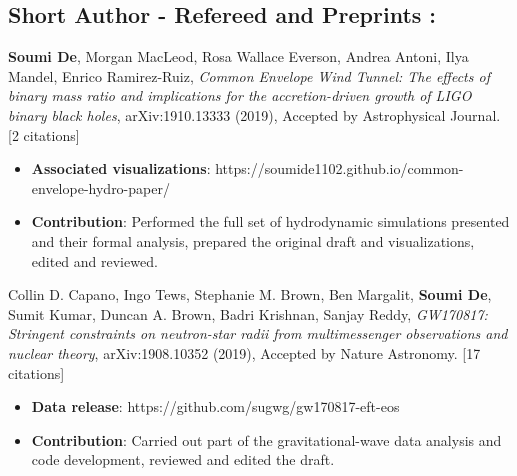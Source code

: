 \subsection{\textbf{Short Author - Refereed and Preprints :}}
\vspace{1mm}
\begin{etaremune}
\renewcommand{\labelenumi}{\textcolor{gray}{\arabic{enumi}.}}
\item{\textbf{Soumi De}, Morgan MacLeod, Rosa Wallace Everson, Andrea Antoni, Ilya Mandel, Enrico Ramirez-Ruiz, \textit{Common Envelope Wind Tunnel: The effects of binary mass ratio and implications for the accretion-driven growth of LIGO binary black holes}, arXiv:1910.13333 (2019), Accepted by Astrophysical Journal. [2 citations]
\begin{itemize}
\vspace{-2mm}
    \item \textbf{Associated visualizations}: https://soumide1102.github.io/common-envelope-hydro-paper/
    \vspace{-1mm}
    \item \textbf{Contribution}: Performed the full set of hydrodynamic simulations presented and their formal analysis, %
    prepared the original draft and visualizations, edited and reviewed.
\end{itemize}
}

\item{Collin D. Capano, Ingo Tews, Stephanie M. Brown, Ben Margalit, \textbf{Soumi De}, Sumit Kumar, Duncan A. Brown, Badri Krishnan, Sanjay Reddy, \textit{GW170817: Stringent constraints on neutron-star radii from multimessenger observations and nuclear theory}, arXiv:1908.10352 (2019), Accepted by Nature Astronomy. [17 citations]
\begin{itemize}
\vspace{-2mm}
    \item \textbf{Data release}: https://github.com/sugwg/gw170817-eft-eos
    \vspace{-1mm}
    \item \textbf{Contribution}:
    Carried out part of the gravitational-wave data analysis and code development, %
    reviewed and edited the draft.
\end{itemize}
}


\end{etaremune}
